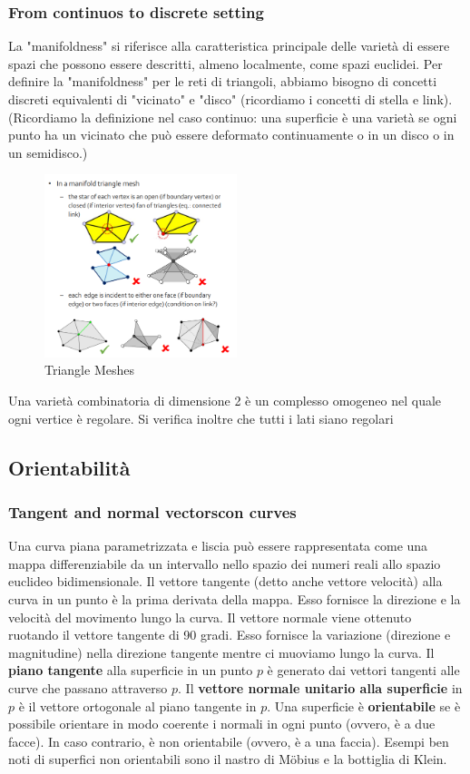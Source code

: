 \subsubsection{From continuos to discrete setting}
La "manifoldness" si riferisce alla caratteristica principale delle varietà di essere spazi che possono essere descritti, almeno localmente, come spazi euclidei.
Per definire la "manifoldness" per le reti di triangoli, abbiamo bisogno di concetti discreti equivalenti di "vicinato" e "disco" (ricordiamo i concetti di stella e link).
(Ricordiamo la definizione nel caso continuo: una superficie è una varietà se ogni punto ha un vicinato che può essere deformato continuamente o in un disco o in un semidisco.)
\begin{figure}[H]
    \centering
    \includegraphics[width=0.5\textwidth]{images/MainfoldTriangle.png} 
    \caption{Triangle Meshes}
    \label{fig:immagine}
\end{figure}
Una varietà combinatoria di dimensione 2 è un complesso omogeneo nel quale ogni vertice è regolare. Si verifica inoltre che tutti i lati siano regolari

\subsection{Orientabilità}
\subsubsection{Tangent and normal vectorscon curves}
Una curva piana parametrizzata e liscia può essere rappresentata come una mappa differenziabile da un intervallo nello spazio dei numeri reali allo spazio euclideo bidimensionale. Il vettore tangente (detto anche vettore velocità) alla curva in un punto è la prima derivata della mappa. Esso fornisce la direzione e la velocità del movimento lungo la curva.
Il vettore normale viene ottenuto ruotando il vettore tangente di 90 gradi. Esso fornisce la variazione (direzione e magnitudine) nella direzione tangente mentre ci muoviamo lungo la curva.
Il \textbf{piano tangente} alla superficie in un punto \( p \) è generato dai vettori tangenti alle curve che passano attraverso \( p \). Il \textbf{vettore normale unitario alla superficie} in \( p \) è il vettore ortogonale al piano tangente in \( p \).
Una superficie è \textbf{orientabile} se è possibile orientare in modo coerente i normali in ogni punto (ovvero, è a due facce). In caso contrario, è non orientabile (ovvero, è a una faccia). Esempi ben noti di superfici non orientabili sono il nastro di Möbius e la bottiglia di Klein.
